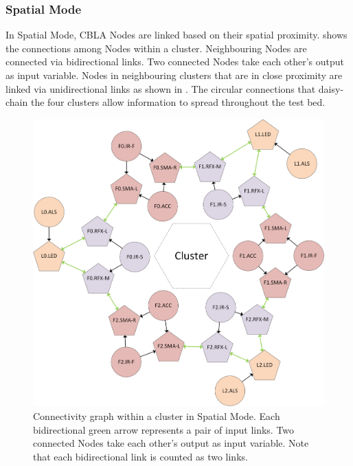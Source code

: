 \subsubsection{Spatial Mode}

In Spatial Mode, CBLA Nodes are linked based on their spatial proximity.  shows the connections among Nodes within a cluster. Neighbouring Nodes are connected via bidirectional links. Two connected Nodes take each other's output as input variable. Nodes in neighbouring clusters that are in close proximity are linked via unidirectional links as shown in . The circular connections that daisy-chain the four clusters allow information to spread throughout the test bed. 

\begin{figure} [!htbp]
	\centering
	\includegraphics[width=1.0\textwidth]{"fig/validations/Spatial Local Mode"}
	\caption[Connectivity graph within a cluster in Spatial Mode]{Connectivity graph within a cluster in Spatial Mode. Each bidirectional green arrow represents a pair of input links. Two connected Nodes take each other's output as input variable. Note that each bidirectional link is counted as two links.}
	\label{fig:Spatial Local Modes}
\end{figure}

